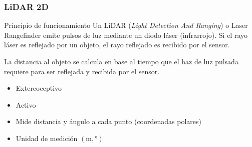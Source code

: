 \begin{frame}
    \frametitle{LiDAR 2D}
    
    \begin{figure}[!h]
        \centering
    \end{figure}

    \scriptsize
    \begin{block}{Principio de funcionamiento}
     Un LiDAR (\emph{Light Detection And Ranging}) o Laser Rangefinder emite pulsos de luz mediante un diodo láser (infrarrojo). Si el rayo láser es reflejado por un objeto, el rayo reflejado es recibido por el sensor.
     
     La distancia al objeto se calcula en base al tiempo que el haz de luz pulsada requiere para ser reflejada y recibida por el sensor.
    \end{block}
    
    \begin{itemize}
        \item Extereoceptivo
        \item Activo
        \item Mide distancia y ángulo a cada punto (coordenadas polares)
        \item Unidad de medición $(\si{\meter},\si{\degree})$
    \end{itemize}


\end{frame}


